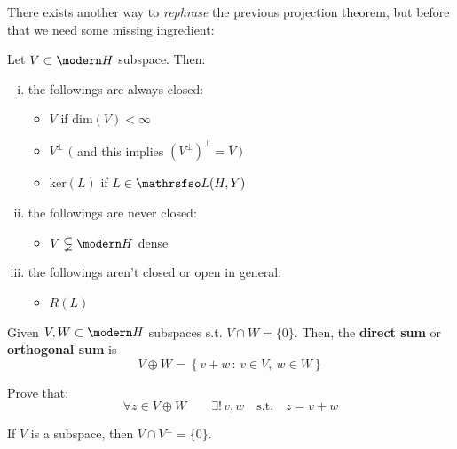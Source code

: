 \newpage


There exists another way to \emph{rephrase} the previous projection theorem, but before that we need some missing ingredient:

\begin{rem}
Let $V\subset \Hc$ subspace. Then:
\begin{enumerate}[(i)]
\item the followings are always closed:
\begin{itemize}
    \item $V$ if $\text{dim}(V)<\infty$
    \item $V^\perp$ $\big($ and this implies $\left( V^\perp \right)^\perp=\overline{V}\ \big)$
    \item $\text{ker}(L)$ if $L\in\rsf{L}(H,Y)$
\end{itemize}

\item the followings are never closed:
\begin{itemize}
    \item $V\subsetneqq \Hc$ dense
\end{itemize}

\item the followings aren't closed or open in general:
\begin{itemize}
    \item $R(L)$
\end{itemize}
\end{enumerate}
\end{rem}

\begin{defn}
Given $V,W\subset \Hc$ subspaces s.t. $V\cap W=\{ 0\}$. Then, the \textbf{direct sum} or \textbf{orthogonal sum} is
\begin{equation*}
V\oplus W = \left\{v+w\,:\,v\in V,\ w\in W \right\}
\end{equation*}
\end{defn}

\begin{es}
Prove that:
\begin{equation*}
\forall z \in V\oplus W \qquad \exists!\,v,w\quad\text{s.t.}\quad z=v+w
\end{equation*}
\end{es}

\begin{rem}
If $V$ is a subspace, then $V\cap V^\perp=\{0\}$.
\end{rem}

